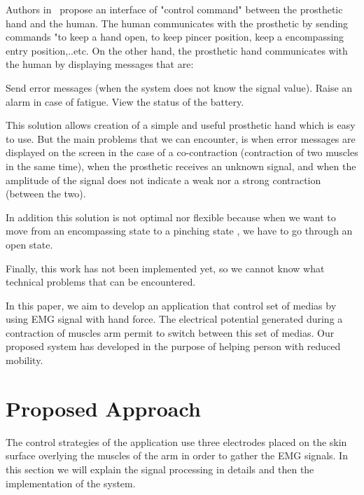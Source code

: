 \documentclass[conference]{IEEEtran}
\begin{document}
Authors in~\cite{Atieh} propose an interface of "control command" between the prosthetic hand and the human. The human communicates with the prosthetic by sending commands "to keep a hand open, to keep pincer position, keep a encompassing entry position,..etc. On the other hand, the prosthetic hand communicates with the human by displaying messages that are:\par
Send error messages (when the system does not know the signal value). Raise an alarm in case of fatigue. View the status of the battery.\par
This solution allows creation of a simple and useful prosthetic hand which is easy to use. But the main problems that we can encounter, is when error messages are displayed on the screen in the case of a co-contraction (contraction of two muscles in the same time), when the prosthetic receives an unknown signal, and when the amplitude of the signal does not indicate a weak nor a strong contraction (between the two).\par
In addition this solution is not optimal nor flexible because when we want to move from an encompassing state to a pinching state , we have to go through an open state.\par
Finally, this work has not been implemented yet, so we cannot know what technical problems that can be encountered. \par


In this paper, we aim to develop an application that control set of medias by using EMG signal with hand force. The electrical potential generated during a contraction of muscles arm permit to switch between this set of medias. Our proposed system has developed in the purpose of helping person with reduced mobility. \par
\section{Proposed Approach} \label{sec:proposedapproach}
The control strategies of the application use three electrodes placed on the skin surface overlying the
muscles of the arm in order to gather the EMG signals. In this section we will explain the signal processing in details and then the implementation of the system.
\end{document}
